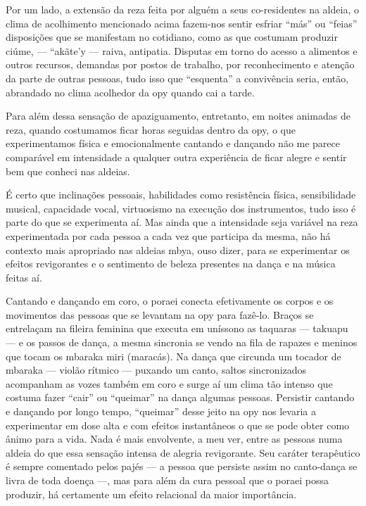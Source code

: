 Por um lado, a extensão da reza feita por alguém a seus co-residentes na
aldeia, o clima de acolhimento mencionado acima fazem-nos sentir
esfriar ``más'' ou ``feias'' disposições que se manifestam no cotidiano,
como as que costumam produzir ciúme, — ``akãte’y — raiva, antipatia.
Disputas em torno do acesso a alimentos e outros recursos, demandas por
postos de trabalho, por reconhecimento e atenção da parte de outras
pessoas, tudo isso que ``esquenta'' a convivência seria, então, abrandado
no clima acolhedor da opy quando cai a tarde.

Para além dessa sensação de apaziguamento, entretanto, em noites
animadas de reza, quando costumamos ficar horas seguidas dentro da opy,
o que experimentamos física e emocionalmente cantando e dançando não me
parece comparável em intensidade a qualquer outra experiência de ficar
alegre e sentir bem que conheci nas aldeias.

É certo que inclinações pessoais, habilidades como resistência física,
sensibilidade musical, capacidade vocal, virtuosismo na execução dos
instrumentos, tudo isso é parte do que se experimenta aí. Mas ainda que
a intensidade seja variável na reza experimentada por cada pessoa a
cada vez que participa da mesma, não há contexto mais apropriado nas
aldeias mbya, ouso dizer, para se experimentar os efeitos revigorantes
e o sentimento de beleza presentes na dança e na música feitas aí.

Cantando e dançando em coro, o poraei conecta efetivamente os corpos e
os movimentos das pessoas que se levantam na opy para fazê-lo. Braços
se entrelaçam na fileira feminina que executa em uníssono as taquaras —
takuapu — e os passos de dança, a mesma sincronia se vendo na fila de
rapazes e meninos que tocam os mbaraka miri (maracás). Na dança que
circunda um tocador de mbaraka — violão rítmico — puxando um canto,
saltos sincronizados acompanham as vozes também em coro e surge aí um
clima tão intenso que costuma fazer ``cair'' ou ``queimar'' na dança
algumas pessoas. Persistir cantando e dançando por longo tempo,
``queimar'' desse jeito na opy nos levaria a experimentar em dose alta e
com efeitos instantâneos o que se pode obter como ânimo para a vida.
Nada é mais envolvente, a meu ver, entre as pessoas numa aldeia do que
essa sensação intensa de alegria revigorante. Seu caráter terapêutico é
sempre comentado pelos pajés — a pessoa que persiste assim no canto-dança
se livra de toda doença —, mas para além da cura pessoal que o
poraei possa produzir, há certamente um efeito relacional da maior
importância.

